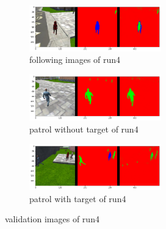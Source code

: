 \documentclass[paper=a4, fontsize=11pt]{scrartcl} %
\numberwithin{equation}{section} %
\numberwithin{figure}{section} %
\numberwithin{table}{section} %
\begin{document}
\begin{figure}[ht]
	\begin{subfigure}{0.33\textwidth}
	\includegraphics[width=0.9\linewidth, height=2cm]{./imgs/following_images4.png} 
	\caption{following images of run4}
	\label{fig:subfollowing_images4}
	\end{subfigure}
	\begin{subfigure}{0.33\textwidth}
	\includegraphics[width=0.9\linewidth, height=2cm]{./imgs/patrol_non_targ4.png}
	\caption{patrol without target of run4}
	\label{fig:subpatrol_non_targ4}
	\end{subfigure}
	\begin{subfigure}{0.33\textwidth}
	\includegraphics[width=0.9\linewidth, height=2cm]{./imgs/patrol_with_targ4.png}
	\caption{patrol with target of run4}
	\label{fig:subpatrol_with_targ4}
	\end{subfigure}

	\caption{validation images of run4}
	\label{fig:outputimages4}
\end{figure}
\end{document}
